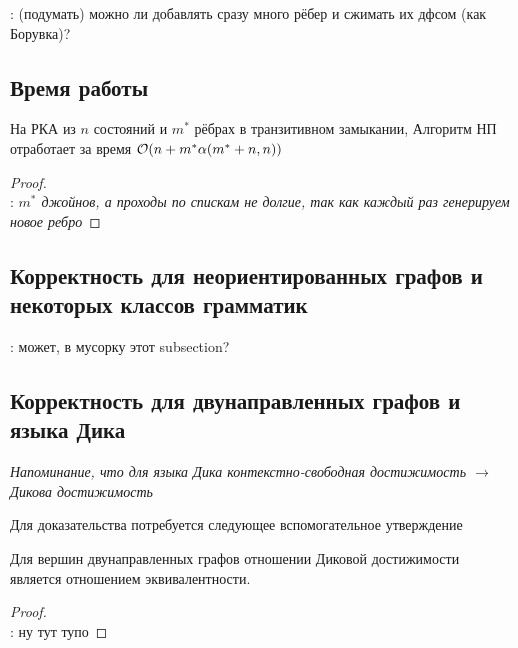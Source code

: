 \TODO: (подумать) можно ли добавлять сразу много рёбер и сжимать их дфсом (как Борувка)?

\subsection{Время работы}

\begin{theorem}
На РКА из $n$ состояний и $m^{*}$ рёбрах в транзитивном замыкании, Алгоритм НП отработает за время $\mathcal{O}(n + m^{*} \alpha(m^{*} + n, n))$
\end{theorem}

\begin{proof}
~\\
\TODO: \textit{$m^{*}$ джойнов, а проходы по спискам не долгие, так как каждый раз генерируем новое ребро}
\end{proof}

\subsection{Корректность для неориентированных графов и некоторых классов грамматик}

\TODO: может, в мусорку этот subsection?

\subsection{Корректность для двунаправленных графов и языка Дика}

\textit{Напоминание, что для языка Дика контекстно-свободная достижимость $\to$ Дикова достижимость}

Для доказательства потребуется следующее вспомогательное утверждение

\begin{lemma}\label{lemma:bidir_equiv}
    Для вершин двунаправленных графов отношении Диковой достижимости является отношением эквивалентности.
\end{lemma}
\begin{proof}
~\\
\TODO: ну тут тупо

\end{proof}

